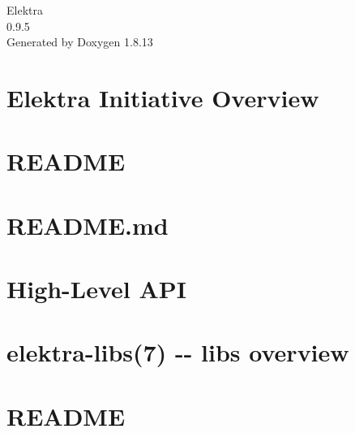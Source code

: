 \documentclass[twoside]{book}
\newcommand{\+}{\discretionary{\mbox{\scriptsize$\hookleftarrow$}}{}{}}
\newcommand{\clearemptydoublepage}{%
  \newpage{\pagestyle{empty}\cleardoublepage}%
}
\begin{document}
\hypersetup{pageanchor=false,
             bookmarksnumbered=true,
             pdfencoding=unicode
            }
\begin{titlepage}
\vspace*{7cm}
\begin{center}%
{\Large Elektra \\[1ex]\large 0.\+9.\+5 }\\
\vspace*{1cm}
{\large Generated by Doxygen 1.8.13}\\
\end{center}
\end{titlepage}
\clearemptydoublepage
{}
\tableofcontents
\clearemptydoublepage
{}
\hypersetup{pageanchor=true}

\chapter{Elektra Initiative Overview}
\label{index}\hypertarget{index}{}
\chapter{R\+E\+A\+D\+ME}
\label{md_src_libs_elektra_README}

\chapter{R\+E\+A\+D\+M\+E.\+md}
\label{src_libs_getenv_README_md}

\chapter{High-\/\+Level A\+PI}
\label{src_libs_highlevel_README_md}

\chapter{elektra-\/libs(7) -\/-\/ libs overview}
\label{src_libs_README_md}

\chapter{R\+E\+A\+D\+ME}
\label{md_src_bindings_io_doc_README}

\end{document}

